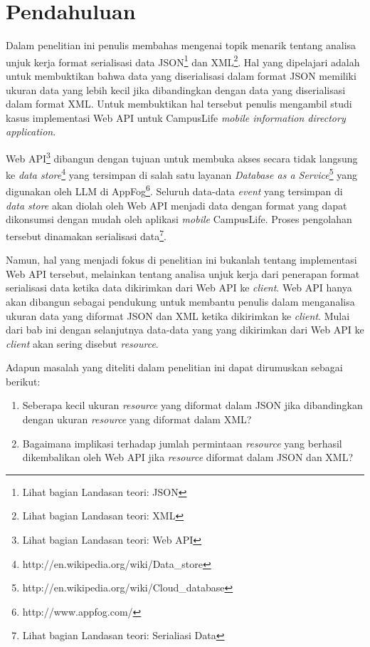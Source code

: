 \documentclass{llncs}
\begin{document}
\section{Pendahuluan}

\onehalfspacing Dalam penelitian ini penulis membahas mengenai topik menarik tentang analisa unjuk kerja format serialisasi data JSON\footnote{Lihat bagian Landasan teori: JSON} dan XML\footnote{Lihat bagian Landasan teori: XML}. Hal yang dipelajari adalah untuk membuktikan bahwa data yang diserialisasi dalam format JSON memiliki ukuran data yang lebih kecil jika dibandingkan dengan data yang diserialisasi dalam format XML. Untuk membuktikan hal tersebut penulis mengambil studi kasus implementasi Web API untuk CampusLife \textit{mobile information directory application}.

Web API\footnote{Lihat bagian Landasan teori: Web API} dibangun dengan tujuan untuk membuka akses secara tidak langsung ke \textit{data store}\footnote{http://en.wikipedia.org/wiki/Data\_store} yang tersimpan di salah satu layanan \textit{Database as a Service}\footnote{http://en.wikipedia.org/wiki/Cloud\_database} yang digunakan oleh LLM di AppFog\footnote{http://www.appfog.com/}. Seluruh data-data \textit{event} yang tersimpan di \textit{data store} akan diolah oleh Web API menjadi data dengan format yang dapat dikonsumsi dengan mudah oleh aplikasi \textit{mobile} CampusLife. Proses pengolahan tersebut dinamakan serialisasi data\footnote{Lihat bagian Landasan teori: Serialiasi Data}.

\onehalfspacing Namun, hal yang menjadi fokus di penelitian ini bukanlah tentang implementasi Web API tersebut, melainkan tentang analisa unjuk kerja dari penerapan format serialisasi data ketika data dikirimkan dari Web API ke \textit{client}. Web API hanya akan dibangun sebagai pendukung untuk membantu penulis dalam menganalisa ukuran data yang diformat JSON dan XML ketika dikirimkan ke \textit{client}. Mulai dari bab ini dengan selanjutnya data-data yang yang dikirimkan dari Web API ke \textit{client} akan sering disebut \textit{resource}. 

\onehalfspacing Adapun masalah yang diteliti dalam penelitian ini dapat dirumuskan sebagai berikut:
\begin{enumerate}
  \item Seberapa kecil ukuran \textit{resource} yang diformat dalam JSON jika dibandingkan dengan ukuran \textit{resource} yang diformat dalam XML? 
  \item Bagaimana implikasi terhadap jumlah permintaan  \textit{resource} yang berhasil dikembalikan oleh Web API jika \textit{resource} diformat dalam JSON dan XML?
\end{enumerate}
\end{document}

